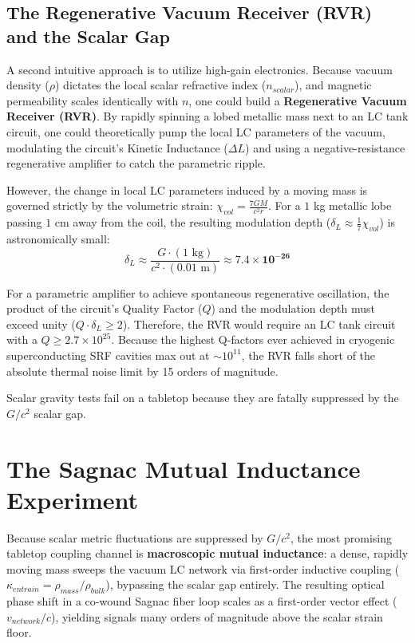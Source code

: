 \subsection{The Regenerative Vacuum Receiver (RVR) and the Scalar Gap}
A second intuitive approach is to utilize high-gain electronics. Because vacuum density ($\rho$) dictates the local scalar refractive index ($n_{scalar}$), and magnetic permeability scales identically with $n$, one could build a \textbf{Regenerative Vacuum Receiver (RVR)}. By rapidly spinning a lobed metallic mass next to an LC tank circuit, one could theoretically pump the local LC parameters of the vacuum, modulating the circuit's Kinetic Inductance ($\Delta L$) and using a negative-resistance regenerative amplifier to catch the parametric ripple.

However, the change in local LC parameters induced by a moving mass is governed strictly by the volumetric strain: $\chi_{vol} = \frac{7GM}{c^2 r}$. For a $1$ kg metallic lobe passing $1$ cm away from the coil, the resulting modulation depth ($\delta_L \approx \frac{1}{7}\chi_{vol}$) is astronomically small:
\begin{equation}
    \delta_L \approx \frac{G \cdot (1\text{ kg})}{c^2 \cdot (0.01\text{ m})} \approx \mathbf{7.4 \times 10^{-26}}
\end{equation}

For a parametric amplifier to achieve spontaneous regenerative oscillation, the product of the circuit's Quality Factor ($Q$) and the modulation depth must exceed unity ($Q \cdot \delta_L \ge 2$). Therefore, the RVR would require an LC tank circuit with a $Q \ge 2.7 \times 10^{25}$. Because the highest Q-factors ever achieved in cryogenic superconducting SRF cavities max out at $\sim 10^{11}$, the RVR falls short of the absolute thermal noise limit by 15 orders of magnitude.

Scalar gravity tests fail on a tabletop because they are fatally suppressed by the $G/c^2$ scalar gap.

\section{The Sagnac Mutual Inductance Experiment}
\label{sec:sagnac_induction}

Because scalar metric fluctuations are suppressed by $G/c^2$, the most promising tabletop coupling channel is \textbf{macroscopic mutual inductance}: a dense, rapidly moving mass sweeps the vacuum LC network via first-order inductive coupling ($\kappa_{entrain} = \rho_{mass}/\rho_{bulk}$), bypassing the scalar gap entirely. The resulting optical phase shift in a co-wound Sagnac fiber loop scales as a first-order vector effect ($v_{network}/c$), yielding signals many orders of magnitude above the scalar strain floor.

